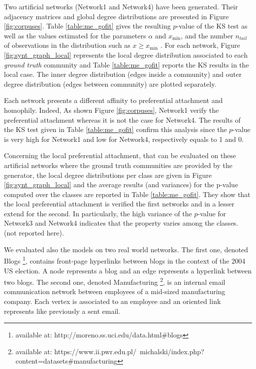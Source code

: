 Two artificial networks (Network1 and Network4) have been generated. Their adjacency matrices and global degree distributions are presented in Figure \ref{fig:corpuses}. Table \ref{table:me_gofit} gives the resulting $p$-value of the KS test as well as the  values estimated for the parameters  $\alpha$ and $x_\text{min}$,  and  the number $n_{tail}$ of observations in the distribution such as $x \geq x_\text{min}$ . For each network, Figure \ref{fig:synt_graph_local} represents the local degree distribution associated to each \emph{ground truth} community and Table \ref{table:me_gofit} reports the KS results in the local case. The inner degree distribution (edges inside a community) and outer degree distribution (edges between community) are plotted separately.

Each network presents a different affinity to preferential attachment and homophily.
Indeed, As shown Figure \ref{fig:corpuses}, Network1 verify the  preferential attachment whereas it is not the case for Network4. The results of the KS test given in Table \ref{table:me_gofit} confirm this analysis since the $p$-value is very high for Network1 and low for Network4, respectively equals to 1 and 0.

Concerning the local preferential attachment, that can be evaluated on these artificial networks where the ground truth communities are provided by the generator, the local degree distributions per class are given in Figure \ref{fig:synt_graph_local} and the average results (and variances) for the p-value computed over the classes are reported in Table \ref{table:me_gofit}. They show that the local preferential attachment is verified the first networks and in a lesser extend for the second. In particularly, the high variance of the $p$-value for Network3 and Network4 indicates that the property varies among the classes. (not reported here).

We evaluated also the models on two real world networks.
The first one, denoted Blogs \footnote{available at: http://moreno.ss.uci.edu/data.html\#blogs}, contains front-page hyperlinks between blogs in the context of the 2004 US election. A node represents a blog and an edge represents a hyperlink between two blogs.
The second one, denoted Manufacturing \footnote{available at: https://www.ii.pwr.edu.pl/~michalski/index.php?content=datasets\#manufacturing}, is an internal email communication network between employees of a mid-sized manufacturing company. Each vertex is associated  to an employee and an oriented link represents like previously a sent email.

